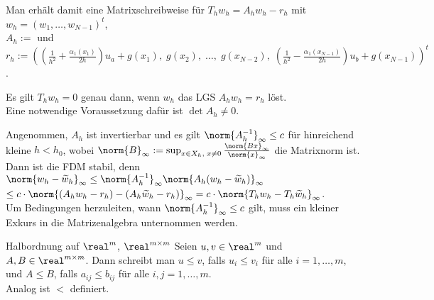 \begin{Bem}
    Man erhält damit eine Matrixschreibweise für $T_h w_h = A_h w_h - r_h$ mit
    $w_h = (w_1, \dotsc, w_{N-1})^t$,\\
    $A_h :=$  und\\
    $r_h :=
    \left(\left(\frac{1}{h^2} + \frac{\alpha_1(x_1)}{2h}\right) u_a + g(x_1),\;
    g(x_2),\; \dotsc,\; g(x_{N-2}),\;
    \left(\frac{1}{h^2} - \frac{\alpha_1(x_{N-1})}{2h}\right) u_b +
    g(x_{N-1})\right)^t$.
    
    Es gilt $T_h w_h = 0$ genau dann, wenn $w_h$ das LGS $A_h w_h = r_h$
    löst.\\
    Eine notwendige Voraussetzung dafür ist $\det A_h \not= 0$.
\end{Bem}

\linie

\begin{Bem}
    Angenommen, $A_h$ ist invertierbar und es gilt
    $\norm{A_h^{-1}}_\infty \le c$ für hinreichend kleine $h < h_0$,
    wobei $\norm{B}_\infty :=
    \sup_{x \in X_h,\; x \not= 0} \frac{\norm{Bx}_\infty}{\norm{x}_\infty}$
    die Matrixnorm ist.\\
    Dann ist die FDM stabil, denn
    $\norm{w_h - \widetilde{w}_h}_\infty \le
    \norm{A_h^{-1}}_\infty \norm{A_h (w_h - \widetilde{w}_h)}_\infty$\\
    $\le c \cdot \norm{(A_h w_h - r_h) - (A_h \widetilde{w}_h - r_h)}_\infty =
    c \cdot \norm{T_h w_h - T_h \widetilde{w}_h}_\infty$.\\
    Um Bedingungen herzuleiten, wann $\norm{A_h^{-1}}_\infty \le c$ gilt,
    muss ein kleiner Exkurs in die Matrizenalgebra unternommen werden.
\end{Bem}

\begin{Def}{Halbordnung auf $\real^m$, $\real^{m \times m}$}
    Seien $u, v \in \real^m$ und $A, B \in \real^{m \times m}$.
    Dann schreibt man $u \le v$, falls $u_i \le v_i$
    für alle $i = 1, \dotsc, m$, und $A \le B$, falls
    $a_{ij} \le b_{ij}$ für alle $i, j = 1, \dotsc, m$.\\
    Analog ist $<$ definiert.
\end{Def}

